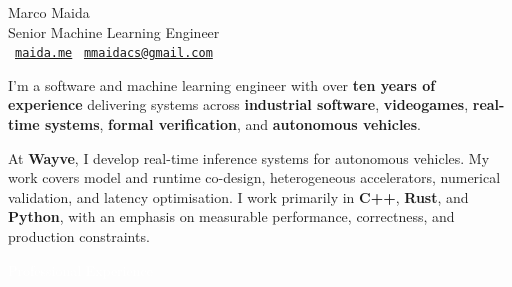 \documentclass[letterpaper]{article}
\newcounter{colorCounter}
\newcommand{\sectioncolor}[1]{%
  \colorbox{%
    \ifodd\value{colorCounter}mainblue\else maingray\fi%
  }{\textcolor{white}{\strut\hspace{6pt}#1\hspace{6pt}}}%
  \stepcounter{colorCounter}%
}
\renewcommand{\section}[1]{%
  \vspace{1.5em}
  {\Large\sectioncolor{#1}}\par
  \vspace{0.8em}
}
\begin{document}
\begin{minipage}[t]{0.7\linewidth}
  {\Huge\color{mainblue}Marco Maida}\\
  {\Large\color{black!80}Senior Machine Learning Engineer}\\
  \vspace{4pt}
  \faGlobe~\href{https://www.maida.me}{\textcolor{mainblue}{\texttt{maida.me}}} \quad
  \faEnvelope~\href{mailto:mmaidacs@gmail.com}{\textcolor{mainblue}{\texttt{mmaidacs@gmail.com}}}
\end{minipage}

\vspace{.5cm}

I’m a software and machine learning engineer with over \textbf{ten years of experience} delivering systems across \textbf{industrial software}, \textbf{videogames}, \textbf{real-time systems}, \textbf{formal verification}, and \textbf{autonomous vehicles}.

\vspace{0.5em}

At \textbf{Wayve}, I develop real-time inference systems for autonomous vehicles. My work covers model and runtime co-design, heterogeneous accelerators, numerical validation, and latency optimisation. I work primarily in \textbf{C++}, \textbf{Rust}, and \textbf{Python}, with an emphasis on measurable performance, correctness, and production constraints.

\vspace{.1cm}

\section{Professional Experience}
\end{document}
